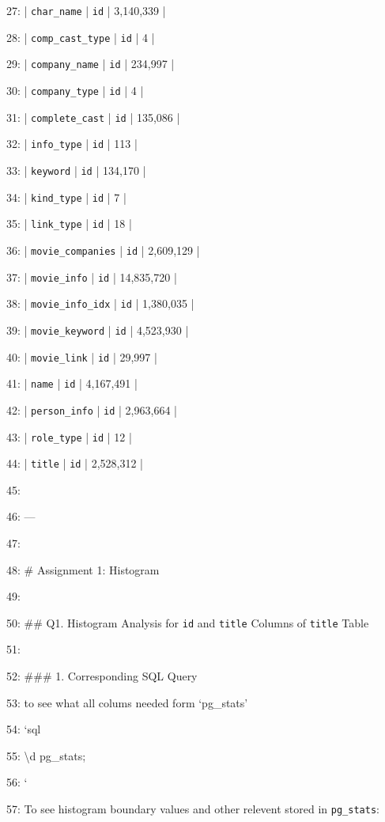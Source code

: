 \documentclass[11pt,a4paper]{article}
\begin{document}
{27: | \texttt{char\_name} | \texttt{id} | 3,140,339 |

28: | \texttt{comp\_cast\_type} | \texttt{id} | 4 |

29: | \texttt{company\_name} | \texttt{id} | 234,997 |

30: | \texttt{company\_type} | \texttt{id} | 4 |

31: | \texttt{complete\_cast} | \texttt{id} | 135,086 |

32: | \texttt{info\_type} | \texttt{id} | 113 |

33: | \texttt{keyword} | \texttt{id} | 134,170 |

34: | \texttt{kind\_type} | \texttt{id} | 7 |

35: | \texttt{link\_type} | \texttt{id} | 18 |

36: | \texttt{movie\_companies} | \texttt{id} | 2,609,129 |

37: | \texttt{movie\_info} | \texttt{id} | 14,835,720 |

38: | \texttt{movie\_info\_idx} | \texttt{id} | 1,380,035 |

39: | \texttt{movie\_keyword} | \texttt{id} | 4,523,930 |

40: | \texttt{movie\_link} | \texttt{id} | 29,997 |

41: | \texttt{name} | \texttt{id} | 4,167,491 |

42: | \texttt{person\_info} | \texttt{id} | 2,963,664 |

43: | \texttt{role\_type} | \texttt{id} | 12 |

44: | \texttt{title} | \texttt{id} | 2,528,312 |

45:

46: ---

47:

48: \# Assignment 1: Histogram

49:

50: \#\# Q1. Histogram Analysis for \texttt{id} and \texttt{title} Columns of \texttt{title} Table

51:

52: \#\#\# 1. Corresponding SQL Query

53: to see what all colums needed form `pg\_stats'

54: \texttt{}`sql

55: \textbackslash{}d pg\_stats;

56: \texttt{}`

57: To see histogram boundary values and other relevent  stored in \texttt{pg\_stats}:

}
\end{document}
